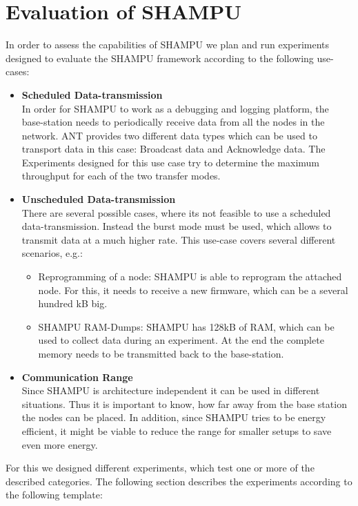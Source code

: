 \chapter{Evaluation of SHAMPU}
In order to assess the capabilities of SHAMPU we plan and run experiments designed to evaluate the SHAMPU framework according to the following use-cases:
\begin{itemize}
	\item{\textbf{Scheduled Data-transmission}} \hfill \\ In order for SHAMPU to work as a debugging and logging platform, the base-station needs to periodically receive data from all the nodes in the network. ANT provides two different data types which can be used to transport data in this case: Broadcast data and Acknowledge data. The Experiments designed for this use case try to determine the maximum throughput for each of the two transfer modes.
	\item{\textbf{Unscheduled Data-transmission}} \hfill \\ There are several possible cases, where its not feasible to use a scheduled data-transmission. Instead the burst mode must be used, which allows to transmit data at a much higher rate. This use-case covers several different scenarios, e.g.:
	\begin{itemize}
		\item{}Reprogramming of a node: SHAMPU is able to reprogram the attached node. For this, it needs to receive a new firmware, which can be a several hundred kB big.
		\item{}SHAMPU RAM-Dumps: SHAMPU has 128kB of RAM, which can be used to collect data during an experiment. At the end the complete memory needs to be transmitted back to the base-station.
	\end{itemize}
	\item{\textbf{Communication Range}} \hfill \\ Since SHAMPU is architecture independent it can be used in different situations. Thus it is important to know, how far away from the base station the nodes can be placed. In addition, since SHAMPU tries to be energy efficient, it might be viable to reduce the range for smaller setups to save even more energy.
\end{itemize}

For this we designed different experiments, which test one or more of the described categories. The following section describes the experiments according to the following template:

